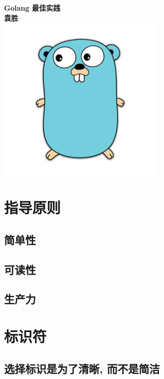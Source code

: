 \documentclass{paper}
\begin{document}
\begin{titlepage}
	\centering
	\vfill
	{\bfseries\Huge
		Golang 最佳实践\\
		\vskip1cm
		\Large
		袁胜 \\
	}
	\vfill
	\includegraphics[width=8cm]{golang.png} %
	\vfill
	\vfill
\end{titlepage}

\tableofcontents

\newpage

\section{指导原则}

\subsection{简单性}

\subsection{可读性}

\subsection{生产力}


\section{标识符}

\subsection{选择标识是为了清晰, 而不是简洁}
\end{document}
